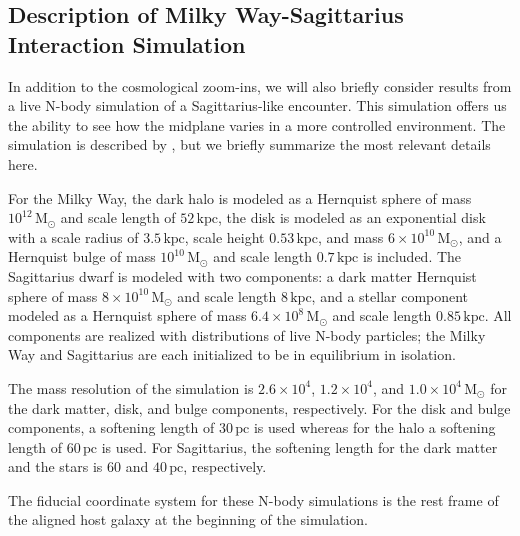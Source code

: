 \documentclass[twocolumn]{aastex62}
\newcommand{\Msun}{\ensuremath{\text{M}_\odot}}
\newcommand{\pc}{\text{pc}}
\newcommand{\kpc}{\text{kpc}}
\begin{document}
\subsection{Description of Milky Way-Sagittarius Interaction Simulation}
\label{ssec:sag_sim}
In addition to the cosmological zoom-ins, we will also briefly consider
results from a live N-body simulation of a Sagittarius-like encounter. This
simulation offers us the ability to see how the midplane varies in a more
controlled environment. The simulation is described by
\citet{2018MNRAS.481..286L}, but we briefly summarize the most relevant
details here.

For the Milky Way, the dark halo is modeled as a Hernquist
sphere of mass $10^{12}\,\Msun$ and scale length of $52\,\kpc$, the
disk is
modeled as an exponential disk with a scale radius of $3.5\,\kpc$, scale
height $0.53\,\kpc$, and mass $6\times10^{10}\,\Msun$, and a Hernquist bulge
of mass $10^{10}\,\Msun$ and scale length $0.7\,\kpc$
\citep{1990ApJ...356..359H} is included. The Sagittarius dwarf is
modeled with two components: a dark matter Hernquist sphere of mass $8\times10^{10}\,\Msun$ and
scale length $8\,\kpc$, and a stellar component modeled as a Hernquist
sphere of mass $6.4\times10^8\,\Msun$ and scale length $0.85\,\kpc$. All
components are realized with distributions of live
N-body particles; the Milky Way and Sagittarius are each initialized
to be in equilibrium in isolation. 
 
The mass resolution of the simulation is $2.6\times10^4$, $1.2\times10^4$, 
and $1.0\times10^4\,\Msun$ for the dark matter, disk, and bulge components,
respectively. For the disk and bulge components, a softening length of
$30\,\pc$ is used whereas for the halo a softening length of $60\,\pc$ is
used. For Sagittarius, the softening length for the dark matter and
the stars is $60$ 
and $40\,\pc$, respectively.

The fiducial coordinate system for these N-body simulations is the rest frame
of the aligned host galaxy at the beginning of the simulation.
\end{document}
